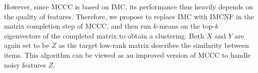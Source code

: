 \documentclass[twoside,11pt]{article}
\begin{document}

However, since MCCC is based on IMC, its performance thus heavily depends on the
quality of features.  Therefore, we propose to replace IMC
with IMCNF in the matrix completion step of MCCC, and then run $k$-means on the
top-$k$ eigenvectors of the completed matrix to obtain a clustering.
Both $X$ and $Y$ are again set to be $Z$ as the target low-rank matrix
describes the similarity between items.
This algorithm can be viewed as an improved version of MCCC to handle noisy features $Z$.
\end{document}
